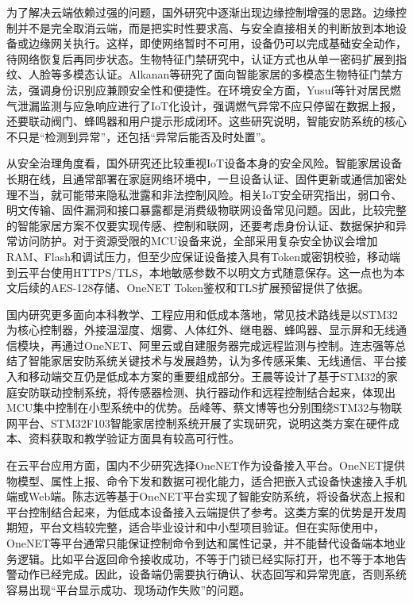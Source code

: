 \documentclass[UTF8,12pt,a4paper,oneside]{ctexbook}
\numberwithin{equation}{chapter}
\let\cite\supercite
\begin{document}
为了解决云端依赖过强的问题，国外研究中逐渐出现边缘控制增强的思路。边缘控制并不是完全取消云端，而是把实时性要求高、与安全直接相关的判断放到本地设备或边缘网关执行。这样，即使网络暂时不可用，设备仍可以完成基础安全动作，待网络恢复后再同步状态。生物特征门禁研究中，认证方式也从单一密码扩展到指纹、人脸等多模态认证。Alkanan等研究了面向智能家居的多模态生物特征门禁方法，强调身份识别应兼顾安全性和便捷性\cite{alkanan2026_biometric}。在环境安全方面，Yusuf等针对居民燃气泄漏监测与应急响应进行了IoT化设计，强调燃气异常不应只停留在数据上报，还要联动阀门、蜂鸣器和用户提示形成闭环\cite{yusuf2026_gas_leakage}。这些研究说明，智能安防系统的核心不只是“检测到异常”，还包括“异常后能否及时处置”。

从安全治理角度看，国外研究还比较重视IoT设备本身的安全风险。智能家居设备长期在线，且通常部署在家庭网络环境中，一旦设备认证、固件更新或通信加密处理不当，就可能带来隐私泄露和非法控制风险。相关IoT安全研究指出，弱口令、明文传输、固件漏洞和接口暴露都是消费级物联网设备常见问题\cite{mqtt_iot_review,rivas2026_vulnerability}。因此，比较完整的智能家居方案不仅要实现传感、控制和联网，还要考虑身份认证、数据保护和异常访问防护。对于资源受限的MCU设备来说，全部采用复杂安全协议会增加RAM、Flash和调试压力，但至少应保证设备接入具有Token或密钥校验，移动端到云平台使用HTTPS/TLS，本地敏感参数不以明文方式随意保存。这一点也为本文后续的AES-128存储、OneNET Token鉴权和TLS扩展预留提供了依据。

国内研究更多面向本科教学、工程应用和低成本落地，常见技术路线是以STM32为核心控制器，外接温湿度、烟雾、人体红外、继电器、蜂鸣器、显示屏和无线通信模块，再通过OneNET、阿里云或自建服务器完成远程监测与控制。连志强等总结了智能家居安防系统关键技术与发展趋势，认为多传感采集、无线通信、平台接入和移动端交互仍是低成本方案的重要组成部分\cite{lian2025_trend}。王晨等设计了基于STM32的家庭安防联动控制系统，将传感器检测、执行器动作和远程控制结合起来，体现出MCU集中控制在小型系统中的优势\cite{wang2024_stm32_linkage}。岳峰等、蔡文博等也分别围绕STM32与物联网平台、STM32F103智能家居控制系统开展了实现研究，说明这类方案在硬件成本、资料获取和教学验证方面具有较高可行性\cite{yue2022_stm32_iot_home,cai2023_stm32f103_control}。

在云平台应用方面，国内不少研究选择OneNET作为设备接入平台。OneNET提供物模型、属性上报、命令下发和数据可视化能力，适合把嵌入式设备快速接入手机端或Web端。陈志远等基于OneNET平台实现了智能安防系统，将设备状态上报和平台控制结合起来，为低成本设备接入云端提供了参考\cite{chen2023_onenet_ai}。这类方案的优势是开发周期短，平台文档较完整，适合毕业设计和中小型项目验证。但在实际使用中，OneNET等平台通常只能保证控制命令到达和属性记录，并不能替代设备端本地业务逻辑。比如平台返回命令接收成功，不等于门锁已经实际打开，也不等于本地告警动作已经完成。因此，设备端仍需要执行确认、状态回写和异常兜底，否则系统容易出现“平台显示成功、现场动作失败”的问题。
\end{document}
